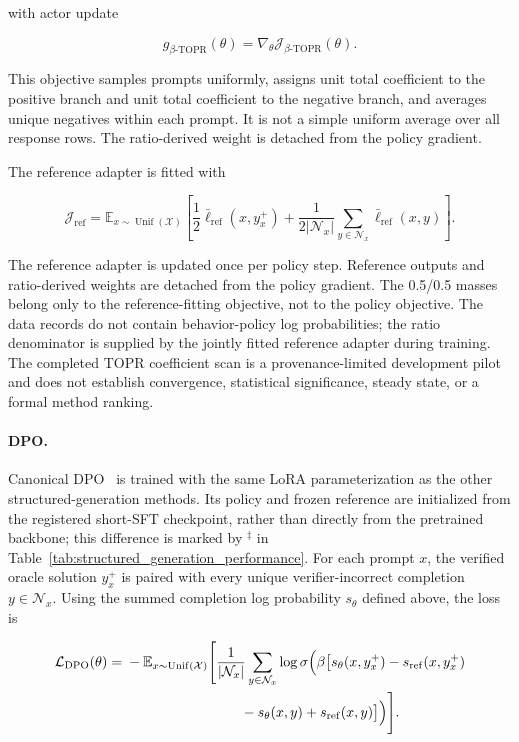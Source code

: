 \documentclass{article}
\theoremstyle{plain}
\theoremstyle{definition}
\theoremstyle{remark}
\begin{document}
with actor update

\[
g_{\beta\text{-}\mathrm{TOPR}}(\theta)
=
\nabla_\theta\mathcal J_{\beta\text{-}\mathrm{TOPR}}(\theta).
\]

This objective samples prompts uniformly, assigns unit total
coefficient to the positive branch and unit total coefficient to the
negative branch, and averages unique negatives within each prompt. It
is not a simple uniform average over all response rows. The
ratio-derived weight is detached from the policy gradient.

The reference adapter is fitted with

\[
\mathcal J_{\mathrm{ref}}
=
\mathbb E_{x\sim\operatorname{Unif}(\mathcal X)}
\left[
\frac{1}{2}\bar{\ell}_{\mathrm{ref}}(x,y_x^+)
+
\frac{1}{2|\mathcal N_x|}
\sum_{y\in\mathcal N_x}
\bar{\ell}_{\mathrm{ref}}(x,y)
\right].
\]

The reference adapter is updated once per policy step. Reference
outputs and ratio-derived weights are detached from the policy
gradient. The 0.5/0.5 masses belong only to the reference-fitting
objective, not to the policy objective. The data records do not contain
behavior-policy log probabilities; the ratio denominator is supplied by
the jointly fitted reference adapter during training. The completed
TOPR coefficient scan is a provenance-limited development pilot and does
not establish convergence, statistical significance, steady state, or
a formal method ranking.

\paragraph{DPO.}

Canonical DPO~\citep{rafailov2023direct} is trained with the same LoRA
parameterization as the other structured-generation methods. Its policy and
frozen reference are initialized from the registered short-SFT checkpoint,
rather than directly from the pretrained backbone; this difference is marked
by \(^{\ddagger}\) in Table~\ref{tab:structured_generation_performance}.
For each prompt \(x\), the verified oracle solution
\(y_x^+\) is paired with every unique verifier-incorrect completion
\(y\in\mathcal N_x\). Using the summed completion log probability
\(s_\theta\) defined above, the loss is

\[
\begin{aligned}
\mathcal L_{\mathrm{DPO}}(\theta)
={}&-
\mathbb E_{x\sim\operatorname{Unif}(\mathcal X)}
\Bigg[
\frac{1}{|\mathcal N_x|}
\sum_{y\in\mathcal N_x}
\log\sigma\Bigl(
\beta\bigl[
 s_\theta(x,y_x^+)-s_{\mathrm{ref}}(x,y_x^+) \\
&\hspace{8.2em}
-s_\theta(x,y)+s_{\mathrm{ref}}(x,y)
\bigr]
\Bigr)
\Bigg].
\end{aligned}
\]
\end{document}
